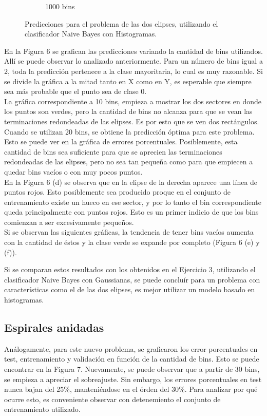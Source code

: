 \documentclass[12pt, a4paper]{article}
\begin{document}
\begin{figure}
\begin{subfigure}[b]{0.42\textwidth}
        \caption{1000 bins}
    \end{subfigure}    
    \caption{Predicciones para el problema de las dos elipses, utilizando el clasificador Naive Bayes con Histogramas.}
\end{figure}


\bigskip

En la Figura 6 se grafican las predicciones variando la cantidad de bins utilizados. Allí se puede observar lo analizado anteriormente. Para un número de bins igual a 2, toda la predicción pertenece a la clase mayoritaria, lo cual es muy razonable. Si se divide la gráfica a la mitad tanto en X como en Y, es esperable que siempre sea más probable que el punto sea de clase 0.  \\
La gráfica correspondiente a 10 bins, empieza a mostrar los dos sectores en donde los puntos son verdes, pero la cantidad de bins no alcanza para que se vean las terminaciones redondeadas de las elipses. Es por esto que se ven dos rectángulos.\\
Cuando se utilizan 20 bins, se obtiene la predicción óptima para este problema. Esto se puede ver en la gráfica de errores porcentuales.  Posiblemente, esta cantidad de bins sea suficiente para que se aprecien las terminaciones redondeadas de las elipses, pero no sea tan pequeña como para que empiecen a quedar bins vacíos o con muy pocos puntos.\\
En la Figura 6 (d) se observa que en la elipse de la derecha aparece una línea de puntos rojos. Esto posiblemente sea producido proque en el conjunto de entrenamiento existe un hueco en ese sector, y por lo tanto el bin correspondiente queda principalmente con puntos rojos. Esto es un primer indicio de que los bins comienzan a ser excesivamente pequeños.\\
Si se observan las siguientes gráficas, la tendencia de tener bins vacíos aumenta con la cantidad de éstos y la clase verde se expande por completo (Figura 6 (e) y (f)).

\bigskip

Si se comparan estos resultados con los obtenidos en el Ejercicio 3, utilizando el clasificador Naive Bayes con Gaussianas, se puede concluír para un problema con características como el de las dos elipses, es mejor utilizar un modelo basado en histogramas.

\subsection*{Espirales anidadas}
Análogamente, para este nuevo problema, se graficaron los error porcentuales en test, entrenamiento y validación en función de la cantidad de bins. Esto se puede encontrar en la Figura 7. Nuevamente, se puede observar que a partir de 30 bins, se empieza a apreciar el sobreajuste. Sin embargo, los errores porcentuales en test nunca bajan del 25\%, manteniéndose en el órden del 30\%. Para analizar por qué ocurre esto, es conveniente observar con detenemiento el conjunto de entrenamiento utilizado.
\end{document}
